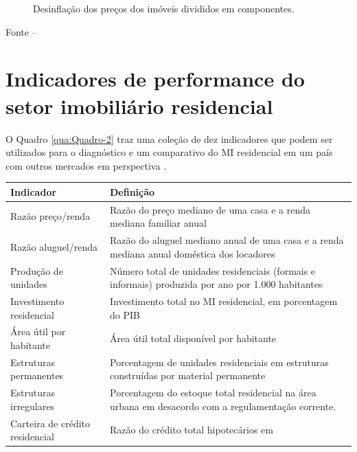 \documentclass[
	12pt,				%
	oneside,			%
	a4paper,			%
	chapter=TITLE,		%
	section=TITLE,		%
	english,			%
	brazil				%
	]{abntex2}
\newcommand{\bcenter}{\begin{center}}
\newcommand{\ecenter}{\end{center}}
\begin{document}
\begin{refsection}
\begin{figure}[H]
{}

\caption{Desinflação dos preços dos imóveis divididos em componentes.}\label{fig:washington3}
\end{figure}
\bcenter

\small Fonte -- \textcite{washington}
\ecenter

\hypertarget{indicadores-de-performance-do-setor-imobiliuxe1rio-residencial}{%
\section{Indicadores de performance do setor imobiliário residencial}\label{indicadores-de-performance-do-setor-imobiliuxe1rio-residencial}}

O Quadro \ref{qua:Quadro-2} traz uma coleção de dez indicadores que podem
ser utilizados para o diagnóstico e um comparativo do \gls{MI} residencial em
um país com outros mercados em perspectiva \autocite[7]{indicators}.
\begin{quadro}[htb]
    \centering
    \caption{\label{qua:Quadro-2}Dez indicadores chave da performance do \gls{MI} residencial.} 
    \begin{tabular}{|p{5cm}|p{10cm}|}
        \hline
        \textbf{Indicador}        & \textbf{Definição}\\ \hline
         Razão preço/renda        & Razão do preço mediano de uma casa e a renda 
         mediana familiar anual  \\ \hline
         Razão aluguel/renda      & Razão do aluguel mediano anual de uma casa e a 
         renda mediana anual doméstica dos locadores       \\ \hline
         Produção de unidades     & Número total de unidades residenciais (formais e 
         informais) produzida por ano por 1.000 habitantes       \\ \hline
         Investimento residencial & Investimento total no \gls{MI} residencial, em 
         porcentagem do \gls{PIB}       \\ \hline
         Área útil por habitante  & Área útil total disponível por habitante \\ \hline
         Estruturas permanentes   & Porcentagem de unidades residenciais em 
         estruturas construídas por material permanente       \\ \hline
         Estruturas irregulares   & Porcentagem do estoque total residencial na área 
         urbana em desacordo com a regulamentação corrente.       \\ \hline
         Carteira de crédito residencial & Razão do crédito total hipotecários em 

\end{tabular}
\end{quadro}
\end{refsection}
\end{document}
